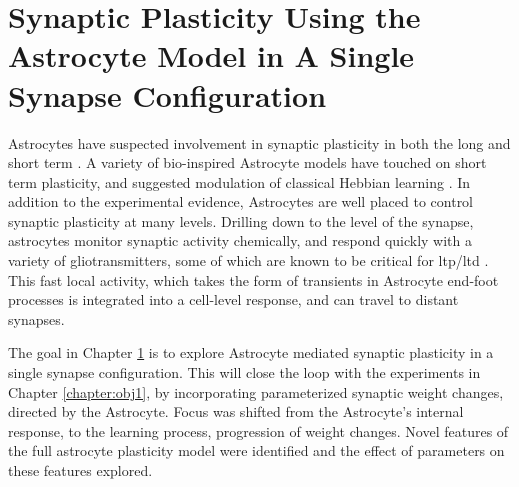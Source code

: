 \chapter{Synaptic Plasticity Using the Astrocyte Model in A Single Synapse
  Configuration} \label{chapter:obj2}

Astrocytes have suspected involvement in synaptic plasticity in both the
long \cite{min_2012} and short term \cite{pitta_2012}. A variety of
bio-inspired Astrocyte models have touched on short term plasticity, and
suggested modulation of classical Hebbian learning \cite{pitta_2016}. In
addition to the experimental evidence, Astrocytes are well placed to control
synaptic plasticity at many levels. Drilling down to the level of the
synapse, astrocytes monitor synaptic activity chemically, and respond
quickly with a variety of gliotransmitters, some of which are known to be
critical for \Gls{ltp}/\Gls{ltd} \cite{min_2012}. This fast local activity, which takes
the form of \ca transients in Astrocyte end-foot processes is integrated
into a cell-level response, and can travel to distant synapses.

The goal in Chapter \ref{chapter:obj2} is to explore Astrocyte mediated synaptic
plasticity in a single synapse configuration. This will close the loop with the
experiments in Chapter \ref{chapter:obj1}, by incorporating parameterized
synaptic weight changes, directed by the Astrocyte. Focus was shifted from the
Astrocyte's internal response, to the learning process, progression of weight
changes. Novel features of the full astrocyte plasticity model were
identified and the effect of parameters on these features explored.


